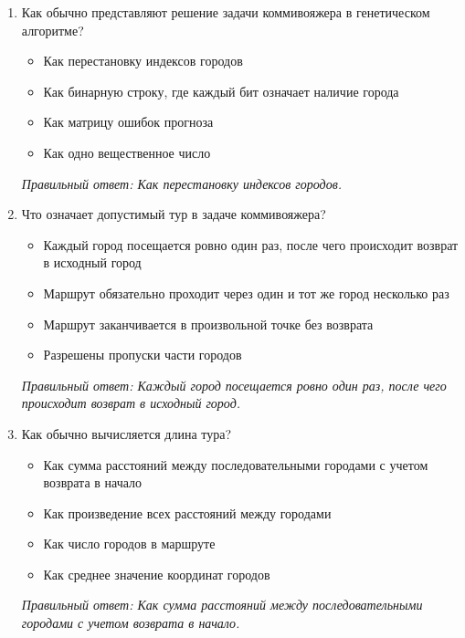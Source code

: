 \small
\begin{enumerate}[label=\textbf{\arabic*.}, leftmargin=0pt, itemsep=1.2em]
\item Как обычно представляют решение задачи коммивояжера в генетическом алгоритме?
\begin{itemize}[label=$\square$, leftmargin=1.5cm, itemsep=0.2em, topsep=0.3em]
\item Как перестановку индексов городов
\item Как бинарную строку, где каждый бит означает наличие города
\item Как матрицу ошибок прогноза
\item Как одно вещественное число
\end{itemize}
{\small\textit{Правильный ответ: Как перестановку индексов городов.}}

\item Что означает допустимый тур в задаче коммивояжера?
\begin{itemize}[label=$\square$, leftmargin=1.5cm, itemsep=0.2em, topsep=0.3em]
\item Каждый город посещается ровно один раз, после чего происходит возврат в исходный город
\item Маршрут обязательно проходит через один и тот же город несколько раз
\item Маршрут заканчивается в произвольной точке без возврата
\item Разрешены пропуски части городов
\end{itemize}
{\small\textit{Правильный ответ: Каждый город посещается ровно один раз, после чего происходит возврат в исходный город.}}

\item Как обычно вычисляется длина тура?
\begin{itemize}[label=$\square$, leftmargin=1.5cm, itemsep=0.2em, topsep=0.3em]
\item Как сумма расстояний между последовательными городами с учетом возврата в начало
\item Как произведение всех расстояний между городами
\item Как число городов в маршруте
\item Как среднее значение координат городов
\end{itemize}
{\small\textit{Правильный ответ: Как сумма расстояний между последовательными городами с учетом возврата в начало.}}


\end{enumerate}
